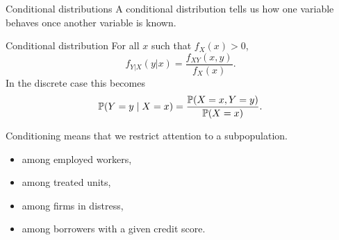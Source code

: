 \documentclass[dvipsnames,aspectratio=169,handout]{beamer}
\begin{document}
\begin{frame}{Conditional distributions}
A conditional distribution tells us how one variable behaves once another variable is known.
\begin{alertblock}{Conditional distribution}
For all $x$ such that $f_X(x)>0$,
\[
f_{Y|X}(y|x)=\frac{f_{XY}(x,y)}{f_X(x)}.
\]
In the discrete case this becomes
\[
\P(Y=y\mid X=x)=\frac{\P(X=x,Y=y)}{\P(X=x)}.
\]
\end{alertblock}
\vspace{-4mm}
\begin{block}{}
\small Conditioning means that we restrict attention to a subpopulation.\\[3mm]
\begin{minipage}{7cm}
	\begin{itemize}
    \item among employed workers,\\[-2mm]
    \item among treated units,\\[-2mm]
\end{itemize}
\end{minipage}\begin{minipage}{8cm}
	\begin{itemize}
    \item among firms in distress,\\[-2mm]
    \item among borrowers with a given credit score.
\end{itemize}
\end{minipage}
\end{block}
\end{frame}
\end{document}
